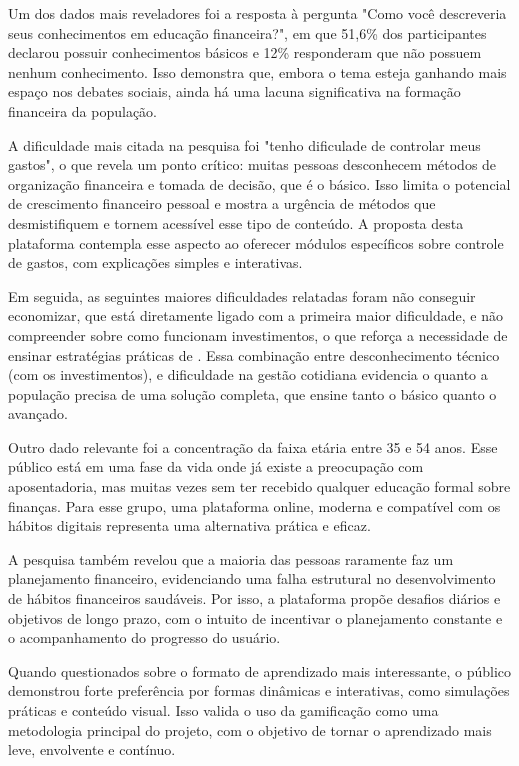 \documentclass[
	article,			%
	12pt,				%
	oneside,			%
	a4paper,			%
	english,			%
	brazil,				%
	sumario=tradicional
	]{abntex2}
\begin{document}
    Um dos dados mais reveladores foi a resposta à pergunta "Como você descreveria seus conhecimentos em educação financeira?", em que 51,6\% dos participantes declarou possuir conhecimentos básicos e 12\% responderam que não possuem nenhum conhecimento. Isso demonstra que, embora o tema esteja ganhando mais espaço nos debates sociais, ainda há uma lacuna significativa na formação financeira da população.

    A dificuldade mais citada na pesquisa foi "tenho dificulade de controlar meus gastos", o que revela um ponto crítico: muitas pessoas desconhecem métodos de organização financeira e tomada de decisão, que é o básico. Isso limita o potencial de crescimento financeiro pessoal e mostra a urgência de métodos que desmistifiquem e tornem acessível esse tipo de conteúdo. A proposta desta plataforma contempla esse aspecto ao oferecer módulos específicos sobre controle de gastos, com explicações simples e interativas.

    Em seguida, as seguintes maiores dificuldades relatadas foram não conseguir economizar, que está diretamente ligado com a primeira maior dificuldade, e não compreender sobre como funcionam investimentos, o que reforça a necessidade de ensinar estratégias práticas de . Essa combinação entre desconhecimento técnico (com os investimentos), e dificuldade na gestão cotidiana evidencia o quanto a população precisa de uma solução completa, que ensine tanto o básico quanto o avançado.

    Outro dado relevante foi a concentração da faixa etária entre 35 e 54 anos. Esse público está em uma fase da vida onde já existe a preocupação com aposentadoria, mas muitas vezes sem ter recebido qualquer educação formal sobre finanças. Para esse grupo, uma plataforma online, moderna e compatível com os hábitos digitais representa uma alternativa prática e eficaz.

    A pesquisa também revelou que a maioria das pessoas raramente faz um planejamento financeiro, evidenciando uma falha estrutural no desenvolvimento de hábitos financeiros saudáveis. Por isso, a plataforma propõe desafios diários e objetivos de longo prazo, com o intuito de incentivar o planejamento constante e o acompanhamento do progresso do usuário.

    Quando questionados sobre o formato de aprendizado mais interessante, o público demonstrou forte preferência por formas dinâmicas e interativas, como simulações práticas e conteúdo visual. Isso valida o uso da gamificação como uma metodologia principal do projeto, com o objetivo de tornar o aprendizado mais leve, envolvente e contínuo.
\end{document}
